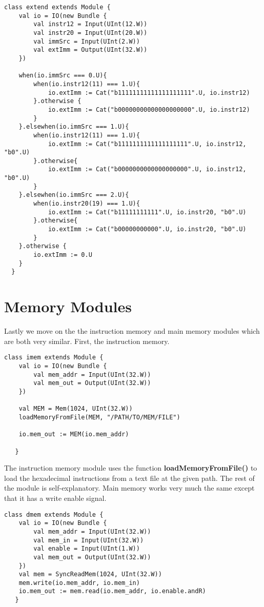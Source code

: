 \documentclass[12pt, letterpaper]{report}
\begin{document}
\begin{lstlisting}[style=scala]
   class extend extends Module {
    val io = IO(new Bundle {
        val instr12 = Input(UInt(12.W))
        val instr20 = Input(UInt(20.W))
        val immSrc = Input(UInt(2.W))
        val extImm = Output(UInt(32.W))
    })

    when(io.immSrc === 0.U){
        when(io.instr12(11) === 1.U){
            io.extImm := Cat("b11111111111111111111".U, io.instr12)
        }.otherwise {
            io.extImm := Cat("b00000000000000000000".U, io.instr12)
        }
    }.elsewhen(io.immSrc === 1.U){
        when(io.instr12(11) === 1.U){
            io.extImm := Cat("b1111111111111111111".U, io.instr12, "b0".U)
        }.otherwise{
            io.extImm := Cat("b0000000000000000000".U, io.instr12, "b0".U)
        }
    }.elsewhen(io.immSrc === 2.U){
        when(io.instr20(19) === 1.U){
            io.extImm := Cat("b11111111111".U, io.instr20, "b0".U)
        }.otherwise{
            io.extImm := Cat("b00000000000".U, io.instr20, "b0".U)
        }
    }.otherwise {
        io.extImm := 0.U
    }
  }
\end{lstlisting}

\section{Memory Modules}
Lastly we move on the the instruction memory and main memory modules which are both very similar.
First, the instruction memory.

\begin{lstlisting}[style=scala]
   class imem extends Module {
    val io = IO(new Bundle {
        val mem_addr = Input(UInt(32.W))
        val mem_out = Output(UInt(32.W))
    })

    val MEM = Mem(1024, UInt(32.W))
    loadMemoryFromFile(MEM, "/PATH/TO/MEM/FILE")

    io.mem_out := MEM(io.mem_addr)
    
   }
\end{lstlisting}

The instruction memory module uses the function \textbf{loadMemoryFromFile()} to load the 
hexadecimal instructions from a text file at the given path. The rest of the module is self-explanatory.
Main memory works very much the same except that it has a write enable signal.

\begin{lstlisting}[style=scala]
   class dmem extends Module {
    val io = IO(new Bundle {
        val mem_addr = Input(UInt(32.W))
        val mem_in = Input(UInt(32.W))
        val enable = Input(UInt(1.W))
        val mem_out = Output(UInt(32.W))
    })
    val mem = SyncReadMem(1024, UInt(32.W))
    mem.write(io.mem_addr, io.mem_in)
    io.mem_out := mem.read(io.mem_addr, io.enable.andR)
   }
\end{lstlisting}
\end{document}
